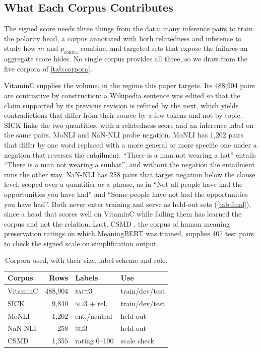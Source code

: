 \documentclass[11pt]{article}
\begin{document}
\subsection{What Each Corpus Contributes}

The signed score needs three things from the data: many inference pairs to train the polarity head, a corpus annotated with both relatedness and inference to study how $m$ and $p_{\mathrm{contra}}$ combine, and targeted sets that expose the failures an aggregate score hides.
No single corpus provides all three, so we draw from the five corpora of \autoref{tab:corpora}.

VitaminC \citep{schuster2021vitaminc} supplies the volume, in the regime this paper targets.
Its 488{,}904 pairs are contrastive by construction: a Wikipedia sentence was edited so that the claim supported by its previous revision is refuted by the next, which yields contradictions that differ from their source by a few tokens and not by topic.
SICK \citep{marelli2014sick} links the two quantities, with a relatedness score and an inference label on the same pairs.
MoNLI \citep{geiger2020monli} and NaN-NLI \citep{truong2022nannli} probe negation.
MoNLI has 1{,}202 pairs that differ by one word replaced with a more general or more specific one under a negation that reverses the entailment: ``There is a man not wearing a hat'' entails ``There is a man not wearing a sunhat'', and without the negation the entailment runs the other way.
NaN-NLI has 258 pairs that target negation below the clause level, scoped over a quantifier or a phrase, as in ``Not all people have had the opportunities you have had'' and ``Some people have not had the opportunities you have had''.
Both never enter training and serve as held-out sets (\autoref{tab:final}), since a head that scores well on VitaminC while failing them has learned the corpus and not the relation.
Last, CSMD \citep{beauchemin2023meaningbert}, the corpus of human meaning preservation ratings on which MeaningBERT was trained, supplies 407 test pairs to check the signed scale on simplification output.

\begin{table}[t]
\centering\small
\begin{tabular}{l r l l}
\toprule
Corpus & Rows & Labels & Use \\
\midrule
VitaminC & 488{,}904 & \textsc{fact3} & train/dev/test \\
SICK & 9{,}840 & \textsc{nli3} + rel. & train/dev/test \\
MoNLI & 1{,}202 & ent./neutral & held-out \\
NaN-NLI & 258 & \textsc{nli3} & held-out \\
CSMD & 1{,}355 & rating 0--100 & scale check \\
\bottomrule
\end{tabular}
\caption{Corpora used, with their size, label scheme and role.}
\label{tab:corpora}
\end{table}
\end{document}
